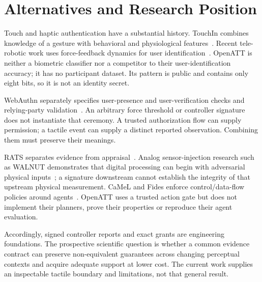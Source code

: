 \section{Alternatives and Research Position}
Touch and haptic authentication have a substantial history. TouchIn combines
knowledge of a gesture with behavioral and physiological features~\cite{touchin}.
Recent tele-robotic work uses force-feedback dynamics for user
identification~\cite{haptic}. OpenATT is neither a biometric classifier nor a
competitor to their user-identification accuracy; it has no participant dataset.
Its pattern is public and contains only eight bits, so it is not an identity
secret.

WebAuthn separately specifies user-presence and user-verification checks and
relying-party validation~\cite{webauthn}. An arbitrary force threshold or
controller signature does not instantiate that ceremony. A trusted authorization
flow can supply permission; a tactile event can supply a distinct reported
observation. Combining them must preserve their meanings.

RATS separates evidence from appraisal~\cite{rats}. Analog sensor-injection
research such as WALNUT demonstrates that digital processing can begin with
adversarial physical inputs~\cite{walnut}; a signature downstream cannot establish
the integrity of that upstream physical measurement. CaMeL and Fides enforce
control/data-flow policies around agents~\cite{camel,fides}. OpenATT uses a
trusted action gate but does not implement their planners, prove their properties
or reproduce their agent evaluation.

Accordingly, signed controller reports and exact grants are engineering
foundations. The prospective scientific question is whether a common evidence
contract can preserve non-equivalent guarantees across changing perceptual
contexts and acquire adequate support at lower cost. The current work supplies
an inspectable tactile boundary and limitations, not that general result.

